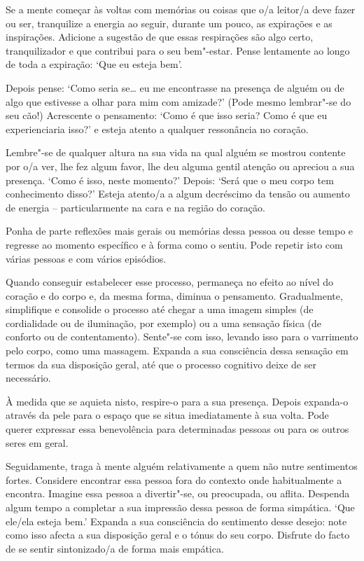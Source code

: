 Se a mente começar às voltas com memórias ou coisas que o/a leitor/a deve fazer
ou ser, tranquilize a energia ao seguir, durante um pouco, as expirações e as
inspirações. Adicione a sugestão de que essas respirações são algo certo,
\mbox{tranquilizador} e que contribui para o seu bem"-estar. Pense lentamente ao longo
de toda a expiração: `Que eu esteja bem'.

\enlargethispage{2\baselineskip}

Depois pense: `Como seria se\ldots{} eu me encontrasse na presença de alguém ou de
algo que estivesse a olhar para mim com amizade?' (Pode mesmo lembrar"-se do seu
cão!) Acrescente o pensamento: `Como é que isso seria? Como é que eu
experienciaria isso?' e esteja atento a qualquer ressonância no coração.

Lembre"-se de qualquer altura na sua vida na qual alguém se mostrou contente por
o/a ver, lhe fez algum favor, lhe deu alguma gentil atenção ou apreciou a sua
presença. `Como é isso, neste momento?' Depois: `Será que o meu corpo tem
conhecimento disso?' Esteja atento/a a algum decréscimo da tensão ou aumento de
energia -- particularmente na cara e na região do coração.

Ponha de parte reflexões mais gerais ou memórias dessa pessoa ou desse tempo e
regresse ao momento específico e à forma como o sentiu. Pode repetir isto com
várias pessoas e com vários episódios.

Quando conseguir estabelecer esse processo, permaneça no efeito ao nível do
coração e do corpo e, da mesma forma, diminua o pensamento. Gradualmente,
simplifique e consolide o processo até chegar a uma imagem simples (de
cordialidade ou de iluminação, por exemplo) ou a uma sensação física (de
conforto ou de contentamento). Sente"-se com isso, levando isso para o varrimento
pelo corpo, como uma massagem. Expanda a sua consciência dessa sensação em
termos da sua disposição geral, até que o processo cognitivo deixe de ser
necessário.

\enlargethispage{2\baselineskip}

À medida que se aquieta nisto, respire-o para a sua presença. Depois expanda-o
através da pele para o espaço que se situa imediatamente à sua volta. Pode
querer expressar essa benevolência para determinadas pessoas ou para os outros
seres em geral.

Seguidamente, traga à mente alguém relativamente a quem não nutre sentimentos
fortes. Considere encontrar essa pessoa fora do contexto onde habitualmente a
encontra. Imagine essa pessoa a divertir"-se, ou preocupada, ou aflita. Despenda
algum tempo a completar a sua impressão dessa pessoa de forma simpática. `Que
ele/ela esteja bem.' Expanda a sua consciência do sentimento desse desejo: note
como isso afecta a sua disposição geral e o tónus do seu corpo. Disfrute do
facto de se sentir sintonizado/a de forma mais empática.

